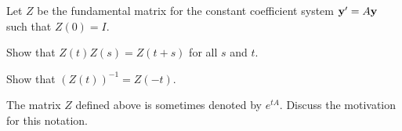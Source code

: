 \begin{exerciselist}
  \item\label{exer:10.3.18} Let $Z$ be the fundamental matrix for the constant coefficient system
        ${\bf y}'=A{\bf y}$ such that $Z(0)=I$.
  \begin{alist}
    \item %
    Show that $Z(t)Z(s)=Z(t+s)$ for all $s$ and $t$. 

    \item %
    Show that $(Z(t))^{-1}=Z(-t)$.

    \item %
    The matrix $Z$ defined above is sometimes denoted by $e^{tA}$. Discuss the motivation for this
    notation.
  \end{alist}
\end{exerciselist}
